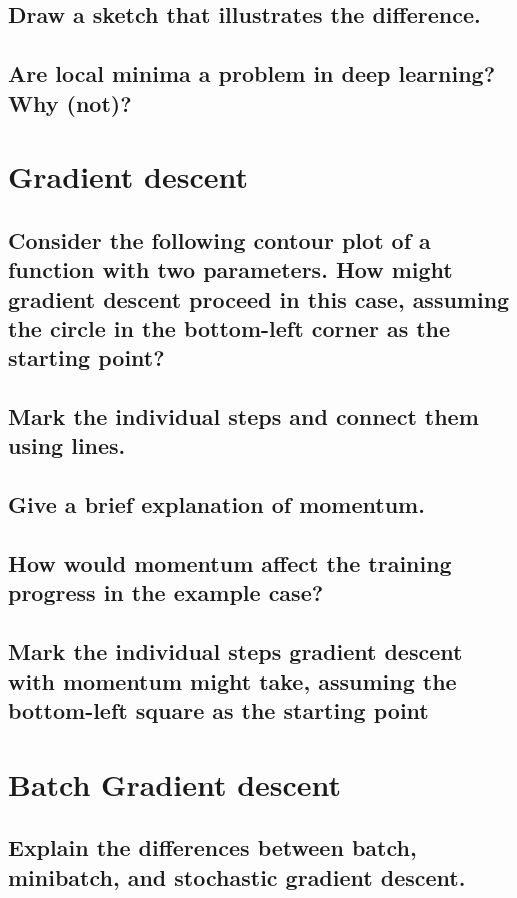 \subsection{Draw a sketch that illustrates the difference.}

\subsection{Are local minima a problem in deep learning?  Why (not)?}

\section{Gradient descent}

\subsection{Consider the following contour plot of a function with two parameters. How might gradient descent proceed in this case, assuming the circle in the bottom-left corner as the starting point?}

\subsection{Mark the individual steps and connect them using lines.}

\subsection{Give a brief explanation of momentum.}

\subsection{How would momentum affect the training progress in the example case?}

\subsection{Mark the individual steps gradient descent with momentum might take, assuming the bottom-left square as the starting point}

\section{Batch Gradient descent}

\subsection{Explain the differences between batch, minibatch, and stochastic gradient descent.}

